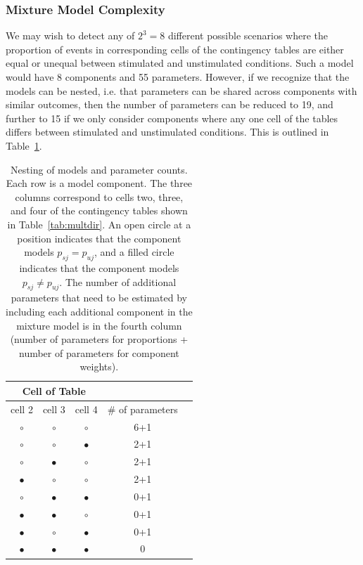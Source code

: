 \documentclass[11pt]{article}
\begin{document}
\subsubsection*{Mixture Model Complexity}
We may wish to detect any of $2^3 = 8$ different possible scenarios where the proportion of events in corresponding cells of the contingency tables are either equal or unequal between stimulated and unstimulated conditions. Such a model would have 8 components and 55 parameters. However, if we recognize that the models can be nested, i.e. that parameters can be shared across components with similar outcomes, then the number of parameters can be reduced to 19, and further to 15 if we only consider components where any one cell of the tables differs between stimulated and unstimulated conditions. This is outlined in Table~\ref{tab:nesting}.
\begin{table}
\centering
\parbox{0.8\linewidth}{\caption{Nesting of models and parameter counts. Each row is a model component. The three columns correspond to cells two, three, and four of the contingency tables shown in Table~\ref{tab:multdir}. An open circle at a position indicates that the component models $p_{sj}=p_{uj}$, and a filled circle indicates that the component models $p_{sj}\ne p_{uj}$. The number of additional parameters that need to be estimated by including each additional component in the mixture model is in the fourth column (number of parameters for proportions + number of parameters for component weights).}\label{tab:nesting}
\centering
\begin{tabular}{ccccc}
\multicolumn{3}{c}{Cell of Table}\\
\hline
cell 2&cell 3&cell 4&\# of parameters\\
\hline
$\circ$&$\circ$&$\circ$&6+1\\
$\circ$&$\circ$&$\bullet$&2+1\\
$\circ$&$\bullet$&$\circ$&2+1\\
$\bullet$&$\circ$&$\circ$&2+1\\
$\circ$&$\bullet$&$\bullet$&0+1\\
$\bullet$&$\bullet$&$\circ$&0+1\\
$\bullet$&$\circ$&$\bullet$&0+1\\
$\bullet$&$\bullet$&$\bullet$&0\\
\end{tabular}
}
\end{table}
\end{document}
